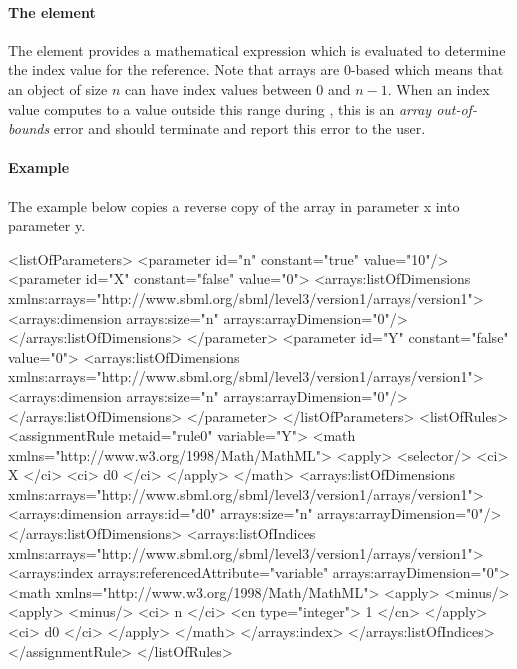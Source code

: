 \paragraph{The  element}

The  element provides a mathematical expression which is evaluated to determine the index value for the reference.   Note that arrays are 0-based which means that an object of size $n$ can have index values between 0 and $n-1$.   When an index value computes to a value outside this range during , this is an \emph{array out-of-bounds} error and  should terminate and report this error to the user.

\paragraph{Example}

The example below copies a reverse copy of the array in parameter x into parameter y.

\begin{example}[showstringspaces=false]
<listOfParameters>
  <parameter id="n" constant="true" value="10"/>
  <parameter id="X" constant="false" value="0">
    <arrays:listOfDimensions xmlns:arrays="http://www.sbml.org/sbml/level3/version1/arrays/version1">
      <arrays:dimension arrays:size="n" arrays:arrayDimension="0"/>
    </arrays:listOfDimensions>
  </parameter>
  <parameter id="Y" constant="false" value="0">
    <arrays:listOfDimensions xmlns:arrays="http://www.sbml.org/sbml/level3/version1/arrays/version1">
      <arrays:dimension arrays:size="n" arrays:arrayDimension="0"/>
    </arrays:listOfDimensions>
  </parameter>
</listOfParameters>
<listOfRules>
  <assignmentRule metaid="rule0" variable="Y">
    <math xmlns="http://www.w3.org/1998/Math/MathML">
      <apply>
        <selector/>
        <ci> X </ci>
        <ci> d0 </ci>
      </apply>
    </math>
    <arrays:listOfDimensions xmlns:arrays="http://www.sbml.org/sbml/level3/version1/arrays/version1">
      <arrays:dimension arrays:id="d0" arrays:size="n" arrays:arrayDimension="0"/>
    </arrays:listOfDimensions>
    <arrays:listOfIndices xmlns:arrays="http://www.sbml.org/sbml/level3/version1/arrays/version1">
      <arrays:index arrays:referencedAttribute="variable" arrays:arrayDimension="0">
        <math xmlns="http://www.w3.org/1998/Math/MathML">
          <apply>
            <minus/>
            <apply>
              <minus/>
              <ci> n </ci>
              <cn type="integer"> 1 </cn>
            </apply>
            <ci> d0 </ci>
          </apply>
        </math>
      </arrays:index>
    </arrays:listOfIndices>
  </assignmentRule>
</listOfRules>
\end{example}

